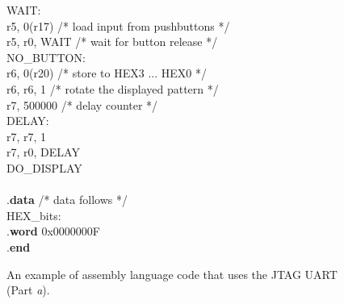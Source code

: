 \begin{figure}[h!]
\begin{center}
\begin{minipage}[t]{12.5 cm}
\begin{tabbing}
WAIT:\\
 \>r5, 0(r17) \>/* load input from pushbuttons */\\
 \>r5, r0, WAIT \>/* wait for button release */\\
NO\_BUTTON:\\
 \>r6, 0(r20) \>/* store to HEX3 ... HEX0 */\\
 \>r6, r6, 1 \>/* rotate the displayed pattern */\\
 \>r7, 500000 \>/* delay counter */\\
DELAY:	\\
 \>r7, r7, 1\\
 \>r7, r0, DELAY	\\
 \>DO\_DISPLAY\\
~\\
\>.{\bf data}	\>\>/* data follows */\\
HEX\_bits:\\
\>.{\bf word} \>0x0000000F\\
\>.{\bf end}\\
\end{tabbing}
\end{minipage}
\end{center}
	\vspace{-0.33in}\caption{An example of assembly language code that uses the JTAG UART
	(Part {\it a}).}
   \label{fig:jtag_uart_s}
\end{figure}
\pagebreak
\clearpage
\newpage

